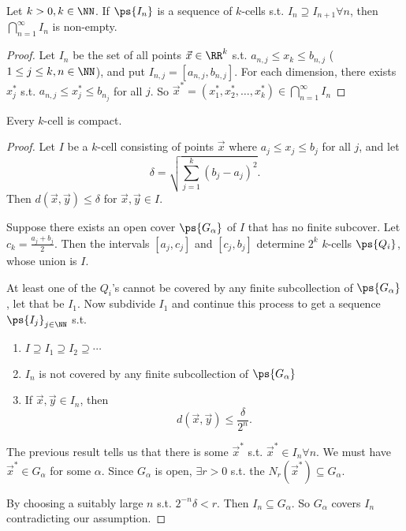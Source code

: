 \documentclass[11pt]{scrartcl}
\numberwithin{equation}{section}
\begin{document}
\begin{lemma}
    Let $k>0,k\in\NN$. If $\ps{I_n}$ is a sequence of $k$-cells s.t.
    $I_n\supseteq I_{n+1}\forall n$, then $\bigcap_{n=1}^{\infty}I_n$
    is non-empty.
\end{lemma}
\begin{proof}
    Let $I_n$ be the set of all points $\vec{x}\in \RR^k$
    s.t. $a_{n,j}\leq x_k\leq b_{n,j}$ ($1\leq j\leq k,n\in\NN$),
    and put $I_{n,j}=[a_{n,j},b_{n,j}]$. For each dimension, 
    there exists $x_j^*$ s.t. $a_{n,j}\leq x_j^*\leq b_{n_j}$ 
    for all $j$. So $\vec{x}^*=(x_1^*,x_2^*,\dots,x_k^*)\in \bigcap_{n=1}^{\infty}I_n$ 
\end{proof}
\begin{lemma}
    Every $k$-cell is compact.
\end{lemma}
\begin{proof}
    Let $I$ be a $k$-cell consisting of points $\vec{x}$
    where $a_j\leq x_j\leq b_j$ for all $j$, and let 
    \[ \delta = \sqrt{\sum_{j=1}^{k}(b_j-a_j)^2}.\]
    Then $d(\vec{x},\vec{y})\leq \delta$ for $\vec{x},\vec{y}\in I$.

    Suppose there exists an open cover $\ps{G_\alpha}$ of $I$ 
    that has no finite subcover. Let $c_k=\frac{a_j+b_j}{2}$.
    Then the intervals $[a_j,c_j]$ and $[c_j,b_j]$ determine 
    $2^k$ $k$-cells $\ps{Q_i}$, whose union is $I$.

    At least one of the $Q_i$'s cannot be covered by any finite 
    subcollection of $\ps{G_\alpha}$, let that be $I_1$. Now 
    subdivide $I_1$ and continue this process to get a 
    sequence $\ps{I_j}_{j\in\NN}$ s.t.
    \begin{enumerate}
        \item $I\supseteq I_1\supseteq I_2\supseteq\cdots$
        \item $I_n$ is not covered by any finite subcollection of $\ps{G_\alpha}$
        \item If $\vec{x},\vec{y}\in I_n$, then 
        \[d(\vec{x},\vec{y})\leq \frac{\delta}{2^n}. \]
    \end{enumerate}
    The previous result tells us that there is some $\vec{x}^*$ 
    s.t. $\vec{x}^*\in I_n\forall n$. We must have $\vec{x}^*\in G_\alpha$
    for some $\alpha$. Since $G_\alpha$ is open, $\exists r>0$ s.t.
    the $N_r(\vec{x}^*)\subseteq G_\alpha$.

    By choosing a suitably large $n$ s.t. $2^{-n}\delta<r$. Then 
    $I_n\subseteq G_\alpha$. So $G_\alpha$ covers $I_n$ contradicting 
    our assumption.
\end{proof}
\end{document}
